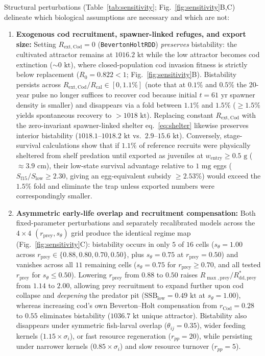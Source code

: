 \documentclass[11pt,letterpaper]{article}
\begin{document}
Structural perturbations (Table~\ref{tab:sensitivity}; Fig.~\ref{fig:sensitivity}B,C) delineate which biological assumptions are necessary and which are not:
\begin{enumerate}
  \item \textbf{Exogenous cod recruitment, spawner-linked refuges, and export size:} Setting $R_{\mathrm{ext,Cod}} = 0$ (\texttt{BevertonHoltRDD}) \emph{preserves} bistability: the cultivated attractor remains at $1016.2\text{ kt}$ while the low attractor becomes cod extinction ($\sim 0\text{ kt}$), where closed-population cod invasion fitness is strictly below replacement ($R_0 = 0.822 < 1$; Fig.~\ref{fig:sensitivity}B). Bistability persists across $R_{\mathrm{ext,Cod}}/R_{\mathrm{cal}} \in [0, 1.1\%]$ (note that at $0.1\%$ and $0.5\%$ the 20-year pulse no longer suffices to recover cod because initial $t = 61\text{ yr}$ spawner density is smaller) and disappears via a fold between $1.1\%$ and $1.5\%$ ($\ge 1.5\%$ yields spontaneous recovery to $> 1018\text{ kt}$). Replacing constant $R_{\mathrm{ext,Cod}}$ with the zero-invariant spawner-linked shelter eq.~\eqref{eq:shelter} likewise preserves interior bistability ($1018.1$--$1018.2\text{ kt}$ vs.\ $2.9$--$15.6\text{ kt}$). Conversely, stage-survival calculations show that if $1.1\%$ of reference recruits were physically sheltered from shelf predation until exported as juveniles at $w_{\mathrm{entry}} \ge 0.5\text{ g}$ ($\approx 3.9\text{ cm}$), their low-state survival advantage relative to $1\text{ mg}$ eggs ($S_{\mathrm{f15}}/S_{\mathrm{low}} \ge 2.30$, giving an egg-equivalent subsidy $\ge 2.53\%$) would exceed the $1.5\%$ fold and eliminate the trap unless exported numbers were correspondingly smaller.
  \item \textbf{Asymmetric early-life overlap and recruitment compensation:} Both fixed-parameter perturbations and separately recalibrated models across the $4 \times 4$ $(r_{\mathrm{prey}}, s_\theta)$ grid produce the identical regime map (Fig.~\ref{fig:sensitivity}C): bistability occurs in only $5$ of $16$ cells ($s_\theta = 1.00$ across $r_{\mathrm{prey}} \in \{0.88, 0.80, 0.70, 0.50\}$, plus $s_\theta = 0.75$ at $r_{\mathrm{prey}} = 0.50$) and vanishes across all $11$ remaining cells ($s_\theta = 0.75$ for $r_{\mathrm{prey}} \ge 0.70$, and all tested $r_{\mathrm{prey}}$ for $s_\theta \le 0.50$). Lowering $r_{\mathrm{prey}}$ from $0.88$ to $0.50$ raises $R_{\max,\mathrm{prey}} / R_{\mathrm{dd},\mathrm{prey}}^*$ from $1.14$ to $2.00$, allowing prey recruitment to expand further upon cod collapse and \emph{deepening} the predator pit ($\mathrm{SSB}_{\mathrm{low}} = 0.49\text{ kt}$ at $s_\theta = 1.00$), whereas increasing cod's own Beverton--Holt compensation from $r_{\mathrm{Cod}} = 0.28$ to $0.55$ eliminates bistability ($1036.7\text{ kt}$ unique attractor). Bistability also disappears under symmetric fish-larval overlap ($\theta_{ij} = 0.35$), wider feeding kernels ($1.15\times \sigma_i$), or fast resource regeneration ($r_{pp} = 20$), while persisting under narrower kernels ($0.85\times \sigma_i$) and slow resource turnover ($r_{pp} = 5$).
\end{enumerate}
\end{document}
